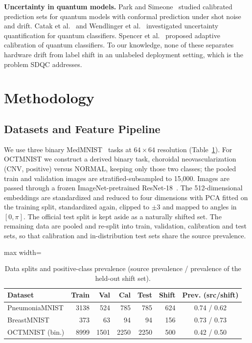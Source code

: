 \documentclass[conference]{IEEEtran}
\begin{document}
\textbf{Uncertainty in quantum models.} Park and Simeone~\cite{park2024} studied calibrated prediction sets for quantum models with conformal prediction under shot noise and drift. Catak et al.~\cite{catak2025} and Wendlinger et al.~\cite{wendlinger2025} investigated uncertainty quantification for quantum classifiers. Spencer et al.~\cite{spencer2026} proposed adaptive calibration of quantum classifiers. To our knowledge, none of these separates hardware drift from label shift in an unlabeled deployment setting, which is the problem SDQC addresses.

\section{Methodology}

\subsection{Datasets and Feature Pipeline}

We use three binary MedMNIST~\cite{yang2023} tasks at $64\times 64$ resolution (Table~\ref{tab:splits}). For OCTMNIST we construct a derived binary task, choroidal neovascularization (CNV, positive) versus NORMAL, keeping only those two classes; the pooled train and validation images are stratified-subsampled to 15,000.
Images are passed through a frozen ImageNet-pretrained ResNet-18~\cite{he2016}. The 512-dimensional embeddings are standardized and reduced to four dimensions with PCA fitted on the training split, standardized again, clipped to $\pm3$ and mapped to angles in $[0,\pi]$. The official test split is kept aside as a naturally shifted set. The remaining data are pooled and re-split into train, validation, calibration and test sets, so that calibration and in-distribution test sets share the source prevalence.

\begin{table}[t]
\centering
\caption{Data splits and positive-class prevalence (source prevalence / prevalence of the held-out shift set).}
\label{tab:splits}
\setlength{\tabcolsep}{4pt}
\begin{adjustbox}{max width=\linewidth}
\begin{tabular}{lrrrrrc}
\toprule
Dataset & Train & Val & Cal & Test & Shift & Prev. (src/shift) \\
\midrule
PneumoniaMNIST & 3138 & 524 & 785 & 785 & 624 & 0.74 / 0.62 \\
BreastMNIST    & 373  & 63  & 94  & 94  & 156 & 0.73 / 0.73 \\
OCTMNIST (bin.)& 8999 & 1501 & 2250 & 2250 & 500 & 0.42 / 0.50 \\
\bottomrule
\end{tabular}
\end{adjustbox}
\end{table}
\end{document}

